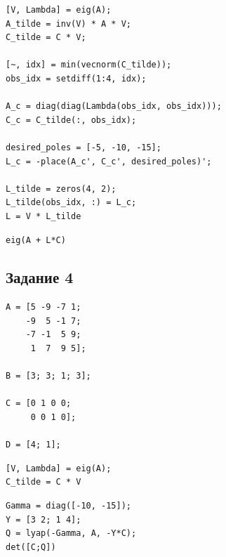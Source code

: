 \documentclass[a4paper,12pt]{article}
\begin{document}
\begin{lstlisting}[caption={Синтез матрицы $L$}, label={lst:L3}]
[V, Lambda] = eig(A);
A_tilde = inv(V) * A * V;
C_tilde = C * V;

[~, idx] = min(vecnorm(C_tilde));
obs_idx = setdiff(1:4, idx);

A_c = diag(diag(Lambda(obs_idx, obs_idx)));
C_c = C_tilde(:, obs_idx);

desired_poles = [-5, -10, -15];
L_c = -place(A_c', C_c', desired_poles)';

L_tilde = zeros(4, 2);
L_tilde(obs_idx, :) = L_c;
L = V * L_tilde
\end{lstlisting}

\begin{lstlisting}[caption={Проверка спектра наблюдателя}, label={lst:eigL3}]
eig(A + L*C)
\end{lstlisting}

\newpage
\subsection*{Задание 4}

\begin{lstlisting}[caption={Инициализация}]
A = [5 -9 -7 1;
	-9  5 -1 7;
	-7 -1  5 9;
	 1  7  9 5];

B = [3; 3; 1; 3];

C = [0 1 0 0;
     0 0 1 0];

D = [4; 1];

\end{lstlisting}

\begin{lstlisting}[caption={Матрица \(C\) в жордане}, label={lst:jordan4}]
[V, Lambda] = eig(A);
C_tilde = C * V
\end{lstlisting}

\begin{lstlisting}[caption={Синтез матрицы $Q$}, label={lst:Q4}]
Gamma = diag([-10, -15]);
Y = [3 2; 1 4];
Q = lyap(-Gamma, A, -Y*C);
det([C;Q])
\end{lstlisting}
\end{document}
